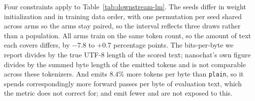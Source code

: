 %
Four constraints apply to Table~\ref{tab:downstream-lm}. The seeds differ in weight
initialization and in training data order, with one permutation per seed shared across arms
so the arms stay paired, so the interval reflects three draws rather than a population. All arms train on
the same token count, so the amount of text each covers differs, by $-7.8$ to $+0.7$
percentage points. The bits-per-byte we report divides by the true UTF-8 length of the scored
text; nanochat's own figure divides by the summed byte length of the emitted tokens and is not
comparable across these tokenizers. And  emits $8.4\%$ more tokens per byte than
\texttt{plain}, so it spends correspondingly more forward passes per byte of evaluation text,
which the metric does not correct for;  and  emit fewer and are not
exposed to this.
